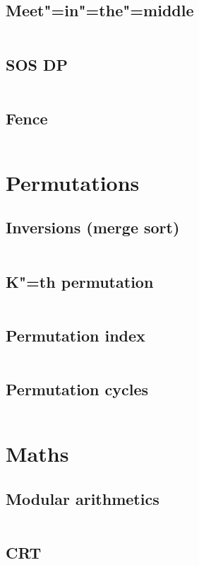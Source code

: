 ﻿\documentclass[10pt,twocolumn,oneside]{article}
\begin{document}
\subsection{Meet"=in"=the"=middle}
\inputminted[breaklines]{cpp}{DP/meet-in-the-middle.cpp}
\subsection{SOS DP}
\inputminted[breaklines]{cpp}{DP/sos-dp.cpp}
\subsection{Fence}
\inputminted[breaklines]{cpp}{DP/fence.cpp}

\section{Permutations}
\subsection{Inversions (merge sort)}
\inputminted[breaklines]{cpp}{Permutations/inversions.cpp}
\subsection{K"=th permutation}
\inputminted[breaklines]{cpp}{Permutations/k-th permutation.cpp}
\subsection{Permutation index}
\inputminted[breaklines]{python}{Permutations/permutation number.py}
\subsection{Permutation cycles}
\inputminted[breaklines]{cpp}{Permutations/permutation cycles.cpp}

\section{Maths}
\subsection{Modular arithmetics}
\inputminted[breaklines]{cpp}{Maths/modular arithmetics.cpp}
\subsection{CRT}
\inputminted[breaklines]{python}{Maths/crt.py}
\end{document}
